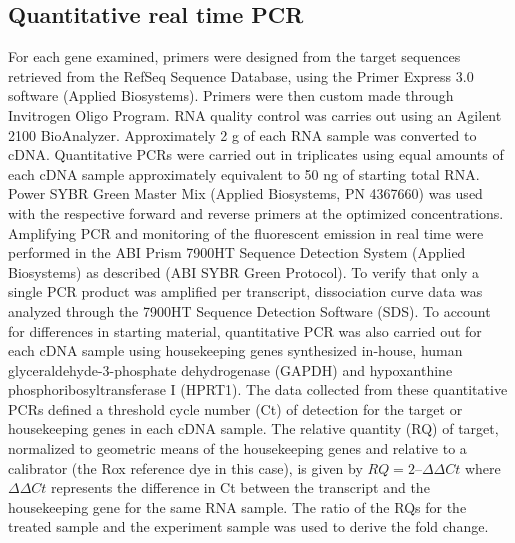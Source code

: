\subsection{Quantitative real time PCR }
For each gene examined, primers were designed from the target sequences retrieved from the RefSeq Sequence Database, using the Primer Express 3.0 software (Applied Biosystems). Primers were then custom made through Invitrogen Oligo Program. RNA quality control was carries out using an Agilent 2100 BioAnalyzer. Approximately 2 \textmu{}g of each RNA sample was converted to cDNA. Quantitative PCRs were carried out in triplicates using equal amounts of each cDNA sample approximately equivalent to 50 ng of starting total RNA. Power SYBR Green Master Mix (Applied Biosystems, PN 4367660) was used with the respective forward and reverse primers at the optimized concentrations. Amplifying PCR and monitoring of the fluorescent emission in real time were performed in the ABI Prism 7900HT Sequence Detection System (Applied Biosystems) as described (ABI SYBR Green Protocol).  To verify that only a single PCR product was amplified per transcript, dissociation curve data was analyzed through the 7900HT Sequence Detection Software (SDS).  To account for differences in starting material, quantitative PCR was also carried out for each cDNA sample using housekeeping genes synthesized in-house, human glyceraldehyde-3-phosphate dehydrogenase (GAPDH) and hypoxanthine phosphoribosyltransferase I (HPRT1).  The data collected from these quantitative PCRs defined a threshold cycle number (Ct) of detection for the target or housekeeping genes in each cDNA sample. The relative quantity (RQ) of target, normalized to geometric means of the housekeeping genes and relative to a calibrator (the Rox reference dye in this case), is given by $RQ = 2 –\Delta \Delta Ct$ where $\Delta \Delta Ct$ represents the difference in Ct between the transcript and the housekeeping gene for the same RNA sample. The ratio of the RQs for the treated sample and the experiment sample was used to derive the fold change.
 
